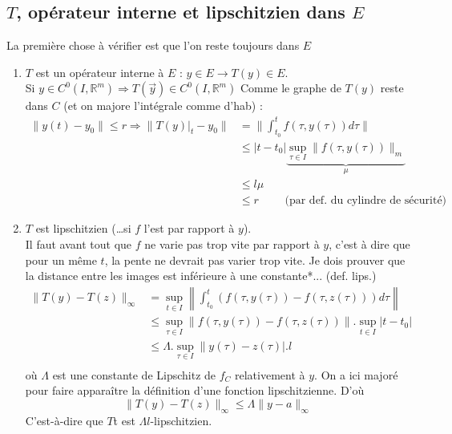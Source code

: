 	\subsection{$T$, opérateur interne et lipschitzien dans $E$}
	La première chose à vérifier est que l'on reste toujours dans $E$
	\begin{enumerate}
	\item $T$ est un opérateur interne à $E$ : $y\in E \rightarrow T(y) \in E$.\\
	Si $y \in C^0(I,\mathbb{R}^m) \Longrightarrow T(\vec{y}) \in C^0(I,\mathbb{R}^m)$
	Comme le graphe de $T(y)$ reste dans $C$ (et on majore l'intégrale comme d'hab) :
	\begin{equation}
	\begin{array}{ll}
	\|y(t)-y_0\| \leq r \Longrightarrow \|T(y)|_t - y_0\| &= \|\int_{t_0}^t f(\tau,y(
	\tau))d\tau\| \\
	 & \leq |t-t_0| \underbrace{\sup_{\tau \in I} \|f(\tau, y(\tau)) \|_m}_{\mu}\\
	 & \leq l\mu\\
	 & \leq r\qquad \text{ (par def. du cylindre de sécurité)}
	\end{array}
	\end{equation}
	
	\item $T$ est lipschitzien (\dots si $f$ l'est par rapport à $y$).\\
	Il faut avant tout que $f$ ne varie pas trop vite par rapport à $y$, c'est à dire 
	que pour un même $t$, la pente ne devrait pas varier trop vite.  Je dois prouver 
	que la distance entre les images est inférieure à une constante*... (def. lips.)
	\begin{equation}
	\begin{array}{ll}
	\| T(y) - T(z)\|_\infty &= \sup_{t\in I} \left\|\int_{t_0}^t(f(\tau,y(\tau))-f(\tau, 
	z(\tau)))d\tau\right\|\\
	 &\leq \sup_{\tau\in I}\|f(\tau,y(\tau))-f(\tau,z(\tau))\|.\sup_{t\in I}|t-t_0|\\
	 &\leq \Lambda.\sup_{\tau\in I}\|y(\tau)-z(\tau)|.l\\	 
	\end{array}
	\end{equation}
	où $\Lambda$ est une constante de Lipschitz de $f_C$ relativement à $y$. On a ici 
	majoré pour faire apparaître la définition d'une fonction lipschitzienne. D'où
	\begin{equation}
	\|T(y)-T(z)\|_\infty \leq \Lambda \|y-a\|_\infty
	\end{equation}
	C'est-à-dire que $T$t est $\Lambda l$-lipschitzien.
	\end{enumerate}
	
